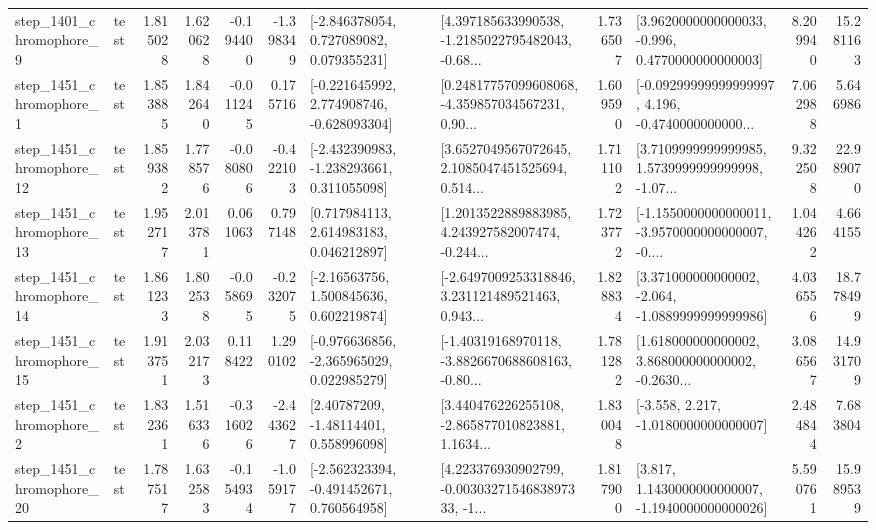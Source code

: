 \begin{tabular}{llrrrrllrlrr}
  step\_1401\_chromophore\_9 &      test &      1.815028 &    1.620628 &     -0.194400 & -1.398349 &    [-2.846378054, 0.727089082, 0.079355231] &  [4.397185633990538, -1.2185022795482043, -0.68... &       1.736507 &   [3.9620000000000033, -0.996, 0.4770000000000003] &            8.209940 &         15.281163 \\
  step\_1451\_chromophore\_1 &      test &      1.853885 &    1.842640 &     -0.011245 &  0.175716 &   [-0.221645992, 2.774908746, -0.628093304] &  [0.24817757099608068, -4.359857034567231, 0.90... &       1.609590 &  [-0.09299999999999997, 4.196, -0.4740000000000... &            7.062988 &          5.646986 \\
 step\_1451\_chromophore\_12 &      test &      1.859382 &    1.778576 &     -0.080806 & -0.422103 &   [-2.432390983, -1.238293661, 0.311055098] &  [3.6527049567072645, 2.1085047451525694, 0.514... &       1.711102 &  [3.7109999999999985, 1.5739999999999998, -1.07... &            9.322508 &         22.989070 \\
 step\_1451\_chromophore\_13 &      test &      1.952717 &    2.013781 &      0.061063 &  0.797148 &     [0.717984113, 2.614983183, 0.046212897] &  [1.2013522889883985, 4.243927582007474, -0.244... &       1.723772 &  [-1.1550000000000011, -3.9570000000000007, -0.... &            1.044262 &          4.664155 \\
 step\_1451\_chromophore\_14 &      test &      1.861233 &    1.802538 &     -0.058695 & -0.232075 &     [-2.16563756, 1.500845636, 0.602219874] &  [-2.6497009253318846, 3.231121489521463, 0.943... &       1.828834 &   [3.371000000000002, -2.064, -1.0889999999999986] &            4.036556 &         18.778499 \\
 step\_1451\_chromophore\_15 &      test &      1.913751 &    2.032173 &      0.118422 &  1.290102 &   [-0.976636856, -2.365965029, 0.022985279] &  [-1.40319168970118, -3.8826670688608163, -0.80... &       1.781282 &  [1.618000000000002, 3.868000000000002, -0.2630... &            3.086567 &         14.931709 \\
  step\_1451\_chromophore\_2 &      test &      1.832361 &    1.516336 &     -0.316026 & -2.443627 &      [2.40787209, -1.48114401, 0.558996098] &  [3.440476226255108, -2.865877010823881, 1.1634... &       1.830048 &               [-3.558, 2.217, -1.0180000000000007] &            2.484844 &          7.683804 \\
 step\_1451\_chromophore\_20 &      test &      1.787517 &    1.632583 &     -0.154934 & -1.059177 &   [-2.562323394, -0.491452671, 0.760564958] &  [4.223376930902799, -0.0030327154683897333, -1... &       1.817900 &   [3.817, 1.1430000000000007, -1.1940000000000026] &            5.590761 &         15.989539 \\

\end{tabular}
